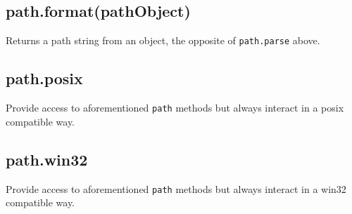 \begin{Shaded}
\begin{Highlighting}[]
\NormalTok{(}\CharTok{\textbackslash{}\textbackslash{}}\CharTok{\textbackslash{}\textbackslash{}}\CharTok{\textbackslash{}\textbackslash{}}\NormalTok{)}
\NormalTok{\{}
    \NormalTok{: }\CharTok{\textbackslash{}\textbackslash{}}\NormalTok{,}
    \NormalTok{: }\CharTok{\textbackslash{}\textbackslash{}}\CharTok{\textbackslash{}\textbackslash{}}\NormalTok{,}
    \NormalTok{: }\NormalTok{,}
    \NormalTok{: }\NormalTok{,}
    \NormalTok{: }
\NormalTok{\}}
\end{Highlighting}
\end{Shaded}

\subsection{path.format(pathObject)}\label{path.formatpathobject}

Returns a path string from an object, the opposite of
\texttt{path.parse} above.

\begin{Shaded}
\begin{Highlighting}[]
\NormalTok{(\{}
    \NormalTok{: }\NormalTok{,}
    \NormalTok{: }\NormalTok{,}
    \NormalTok{: }\NormalTok{,}
    \NormalTok{: }\NormalTok{,}
    \NormalTok{: }
\NormalTok{\})}
\end{Highlighting}
\end{Shaded}

\subsection{path.posix}\label{path.posix}

Provide access to aforementioned \texttt{path} methods but always
interact in a posix compatible way.

\subsection{path.win32}\label{path.win32}

Provide access to aforementioned \texttt{path} methods but always
interact in a win32 compatible way.
